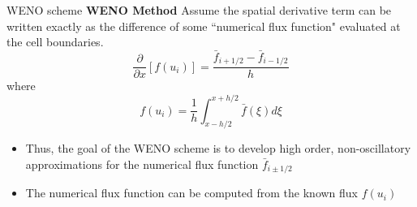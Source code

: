 \documentclass[9pt]{beamer}
\begin{document}

\begin{frame}{WENO scheme}
  \textbf{WENO Method}  
  \newline Assume the spatial derivative term can be written exactly as the difference of some ``numerical flux function" evaluated at the cell boundaries.
  \begin{equation}
    \frac{\partial}{\partial x}[f(u_i)] = \frac{\bar{f}_{i+1 /2} - \bar{f}_{i-1/2}}{h}
  \end{equation}
  where
  \begin{equation}
    f(u_i)=\frac{1}{h}\int_{x-h/2}^{x+h/2} \bar{f}(\xi)d\xi
  \end{equation}
  \begin{itemize}
  \item Thus, the goal of the WENO scheme is to develop high order, non-oscillatory approximations for the numerical flux function $\bar{f}_{i\pm1/2}$
  \item The numerical flux function can be computed from the known flux $f(u_i)$
  \end{itemize}
  \end{frame}
\end{document}
